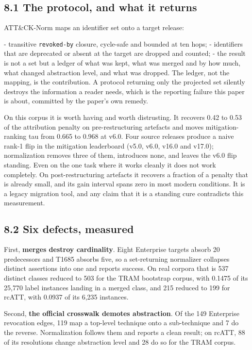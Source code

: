\documentclass[11pt,a4paper]{article}
\begin{document}
\subsection{8.1 The protocol, and what it returns}

ATT\&CK-Norm maps an identifier set onto a target release:

- transitive \texttt{revoked-by} closure, cycle-safe and bounded at ten hops;
- identifiers that are deprecated or absent at the target are dropped and counted;
- the result is not a set but a ledger of what was kept, what was merged and by how much, what changed abstraction level, and what was dropped.
 The ledger, not the mapping, is the contribution. A protocol returning only the projected set silently destroys the information a reader needs, which is the reporting failure this paper is about, committed by the paper's own remedy.

On this corpus it is worth having and worth distrusting. It recovers 0.42 to 0.53 of the attribution penalty on pre-restructuring artefacts and moves mitigation-ranking tau from 0.665 to 0.968 at v6.0. Four source releases produce a naive rank-1 flip in the mitigation leaderboard (v5.0, v6.0, v16.0 and v17.0); normalization removes three of them, introduces none, and leaves the v6.0 flip standing. Even on the one task where it works cleanly it does not work completely. On post-restructuring artefacts it recovers a fraction of a penalty that is already small, and its gain interval spans zero in most modern conditions. It is a legacy migration tool, and any claim that it is a standing cure contradicts this measurement.

\subsection{8.2 Six defects, measured}

First, \textbf{merges destroy cardinality}. Eight Enterprise targets absorb 20 predecessors and T1685 absorbs five, so a set-returning normalizer collapses distinct assertions into one and reports success. On real corpora that is 537 distinct classes reduced to 503 for the TRAM bootstrap corpus, with 0.1475 of its 25,770 label instances landing in a merged class, and 215 reduced to 199 for rcATT, with 0.0937 of its 6,235 instances.

Second, \textbf{the official crosswalk demotes abstraction}. Of the 149 Enterprise revocation edges, 119 map a top-level technique onto a sub-technique and 7 do the reverse. Normalization follows them and reports a clean result; on rcATT, 88 of its resolutions change abstraction level and 28 do so for the TRAM corpus.
\end{document}
